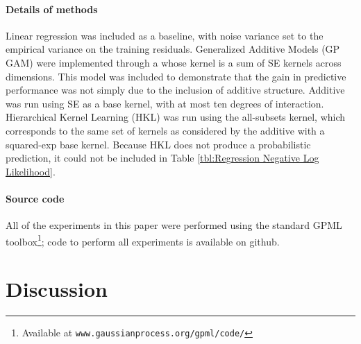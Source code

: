 \documentclass[twoside]{article}
\begin{document}
{\paragraph{Details of methods}

Linear regression was included as a baseline, with noise variance set to the empirical variance on the training residuals.
%
Generalized Additive Models (GP GAM) were implemented through a \gp{} whose kernel is a sum of SE kernels across dimensions.
This model was included to demonstrate that the gain in predictive performance was not simply due to the inclusion of additive structure.
%
Additive \gp{} was run using SE as a base kernel, with at most ten degrees of interaction.
%
Hierarchical Kernel Learning (HKL)
was run using the all-subsets kernel, which corresponds to the same set of kernels as considered by the additive \gp{} with a squared-exp base kernel.  Because HKL does not produce a probabilistic prediction, it could not be included in Table \ref{tbl:Regression Negative Log Likelihood}.
%

\paragraph{Source code}All of the experiments in this paper were performed using the standard GPML toolbox\footnote{Available at \texttt{www.gaussianprocess.org/gpml/code/}}; code to perform all experiments is available on github.








\section{Discussion}

}
\end{document}
